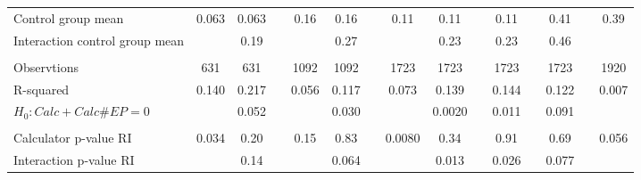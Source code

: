 \begin{tabular}{lcccccccccccccc}
\midrule
Control group mean & 0.063 & 0.063 &       & 0.16  & 0.16  &       & 0.11  & 0.11  &       & 0.11  &       & 0.41  &       & 0.39 \\
Interaction control group mean &       & 0.19  &       &       & 0.27  &       &       & 0.23  &       & 0.23  &       & 0.46  &       &  \\
\midrule
      &       &       &       &       &       &       &       &       &       &       &       &       &       &  \\
\midrule
Observtions & 631   & 631   &       & 1092  & 1092  &       & 1723  & 1723  &       & 1723  &       & 1723  &       & 1920 \\
R-squared & 0.140 & 0.217 &       & 0.056 & 0.117 &       & 0.073 & 0.139 &       & 0.144 &       & 0.122 &       & 0.007 \\
$H_0 : Calc + Calc\# EP = 0$ &       & 0.052 &       &       & 0.030 &       &       & 0.0020 &       & 0.011 &       & 0.091 &       &  \\
\midrule
      &       &       &       &       &       &       &       &       &       &       &       &       &       &  \\
\midrule
Calculator p-value RI & 0.034 & 0.20  &       & 0.15  & 0.83  &       & 0.0080 & 0.34  &       & 0.91  &       & 0.69  &       & 0.056 \\
Interaction p-value RI &       & 0.14  &       &       & 0.064 &       &       & 0.013 &       & 0.026 &       & 0.077 &       &  \\
\bottomrule
\bottomrule
\end{tabular}%
